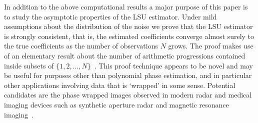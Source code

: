\documentclass[journal]{IEEEtran}
\begin{document}
In addition to the above computational results a major purpose of this paper is to study the asymptotic properties of the LSU estimator.  Under mild assumptions about the distribution of the noise we prove that the LSU estimator is strongly consistent, that is, the estimated coefficients converge almost surely to the true coefficients as the number of observations $N$ grows.  %
The proof makes use of an elementary result about the number of arithmetic progressions contained inside subsets of $\{1,2,\dots,N\}$~\cite{Erdos_on_some_sequence_of_integers1936,Szemeredi_setint_no_k_arth1975,Gowers_new_proof2001}.  %
This proof technique appears to be novel and may be useful for purposes other than polynomial phase estimation, and in particular other applications involving data that is `wrapped' in some sense.  Potential candidates are the phase wrapped images observed in modern radar and medical imaging devices such as synthetic aperture radar and magnetic resonance imaging~\cite{Katkovnik_phasela_2009, Nico_phaseunwrappingSAR_2000,Friedlander_PD_phaseunwrapping_1996}.  
\end{document}
